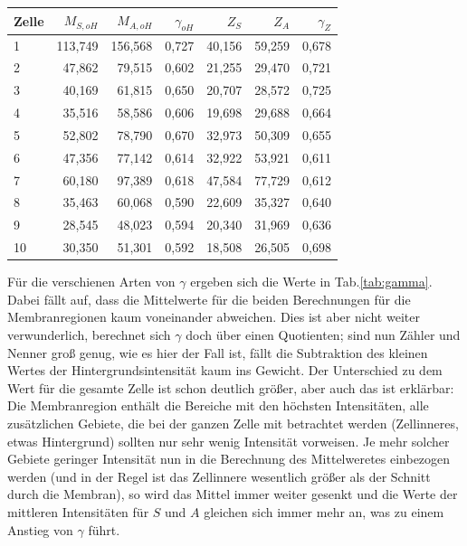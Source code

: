 \begin{center}
    \centering
    \begin{tabular}{lrrrrrr}
        \toprule
        Zelle &  $M_{S,oH}$ &  $M_{A,oH}$ &  $\gamma_{oH}$ &   $Z_S$ &   $Z_A$ &  $\gamma_Z$ \\
        \midrule
        1     & 113,749 & 156,568 &     0,727 & 40,156 & 59,259 &    0,678 \\
        2     &  47,862 &  79,515 &     0,602 & 21,255 & 29,470 &    0,721 \\
        3     &  40,169 &  61,815 &     0,650 & 20,707 & 28,572 &    0,725 \\
        4     &  35,516 &  58,586 &     0,606 & 19,698 & 29,688 &    0,664 \\
        5     &  52,802 &  78,790 &     0,670 & 32,973 & 50,309 &    0,655 \\
        6     &  47,356 &  77,142 &     0,614 & 32,922 & 53,921 &    0,611 \\
        7     &  60,180 &  97,389 &     0,618 & 47,584 & 77,729 &    0,612 \\
        8     &  35,463 &  60,068 &     0,590 & 22,609 & 35,327 &    0,640 \\
        9     &  28,545 &  48,023 &     0,594 & 20,340 & 31,969 &    0,636 \\
        10    &  30,350 &  51,301 &     0,592 & 18,508 & 26,505 &    0,698 \\
        \bottomrule
    \end{tabular}
    \label{tab:YFP2}
\end{center}

Für die verschienen Arten von $\gamma$ ergeben sich die Werte in Tab.\ref{tab:gamma}. Dabei fällt auf, dass die Mittelwerte für die beiden 
Berechnungen für die Membranregionen kaum voneinander abweichen. Dies ist aber nicht weiter verwunderlich, berechnet sich $\gamma$ doch 
über einen Quotienten; sind nun Zähler und Nenner groß genug, wie es hier der Fall ist, fällt die Subtraktion des kleinen Wertes der 
Hintergrundsintensität kaum ins Gewicht. Der Unterschied zu dem Wert für die gesamte Zelle ist schon deutlich größer, aber auch das 
ist erklärbar: Die Membranregion enthält die Bereiche mit den höchsten Intensitäten, alle zusätzlichen Gebiete, die bei der ganzen Zelle 
mit betrachtet werden (Zellinneres, etwas Hintergrund) sollten nur sehr wenig Intensität vorweisen. Je mehr solcher Gebiete geringer 
Intensität nun in die Berechnung des Mittelweretes einbezogen werden (und in der Regel ist das Zellinnere wesentlich größer als der 
Schnitt durch die Membran), so wird das Mittel immer weiter gesenkt und die Werte der mittleren Intensitäten für $S$ und $A$ gleichen sich 
immer mehr an, was zu einem Anstieg von $\gamma$ führt.

